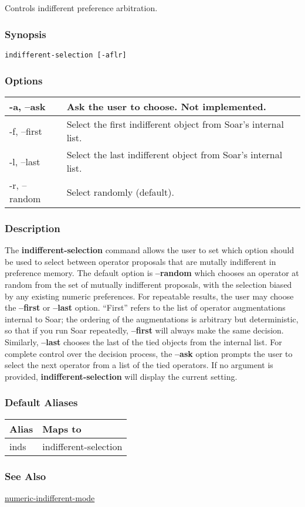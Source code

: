 \subsection{}
\label{indifferent-selection}
Controls indifferent preference arbitration. 
\subsubsection*{Synopsis}
\begin{verbatim}
indifferent-selection [-aflr]
\end{verbatim}
\subsubsection*{Options}
\begin{tabular}{|l|l|}
\hline 
 -a, --ask  & Ask the user to choose. Not implemented. \\
 \hline 
 -f, --first  & Select the first indifferent object from Soar's internal list.  \\
 \hline 
 -l, --last  & Select the last indifferent object from Soar's internal list.  \\
 \hline 
 -r, --random  & Select randomly (default).  \\
 \hline 
\end{tabular}
\subsubsection*{Description}
 The \textbf{indifferent-selection}
 command allows the user to set which option should be used to select between operator proposals that are mutally indifferent in preference memory. 
 The default option is \textbf{--random}
 which chooses an operator at random from the set of mutually indifferent proposals, with the selection biased by any existing numeric preferences. For repeatable results, the user may choose the \textbf{--first}
 or \textbf{--last}
 option. ``First'' refers to the list of operator augmentations internal to Soar; the ordering of the augmentations is arbitrary but deterministic, so that if you run Soar repeatedly, \textbf{--first}
 will always make the same decision. Similarly, \textbf{--last}
 chooses the last of the tied objects from the internal list. For complete control over the decision process, the \textbf{--ask}
 option prompts the user to select the next operator from a list of the tied operators. 
 If no argument is provided, \textbf{indifferent-selection}
 will display the current setting. 
\subsubsection*{Default Aliases}
\begin{tabular}{|l|l|}
\hline 
 Alias  & Maps to  \\
 \hline 
 inds  & indifferent-selection  \\
 \hline 
\end{tabular}
\subsubsection*{See Also}
\hyperref[numeric-indifferent-mode]{numeric-indifferent-mode} 